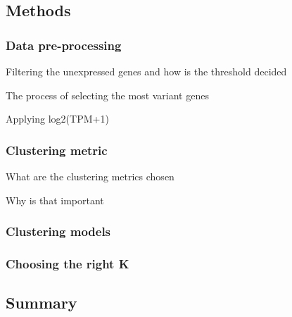 

\subsection{Methods} \label{s:cs:methods}


\subsubsection{Data pre-processing}

\begin{todolist}
    \item Filtering the unexpressed genes and how is the threshold decided
    \item The process of selecting the most variant genes
    \item Applying log2(TPM+1)
\end{todolist}

\subsubsection{Clustering metric}

\begin{todolist}
    \item What are the clustering metrics chosen
    \item Why is that important
\end{todolist}


\subsubsection{Clustering models}


\subsubsection{Choosing the right K}

\subsection{Summary}